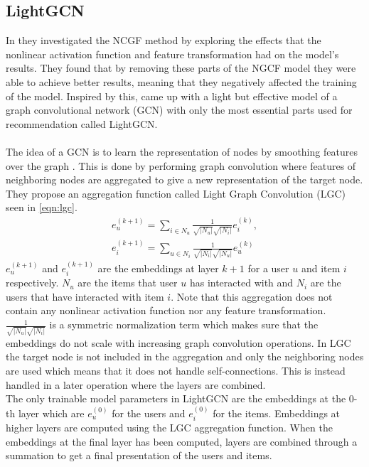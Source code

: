 \subsection{LightGCN}
In \cite{LightGCN} they investigated the NCGF method by exploring the effects that the nonlinear activation function and feature transformation had on the model's results.
They found that by removing these parts of the NGCF model they were able to achieve better results, meaning that they negatively affected the training of the model.
Inspired by this, \cite{LightGCN} came up with a light but effective model of a graph convolutional network (GCN) with only the most essential parts used for recommendation called LightGCN.
\\\\
The idea of a GCN is to learn the representation of nodes by smoothing features over the graph \cite{LightGCN}.
This is done by performing graph convolution where features of neighboring nodes are aggregated to give a new representation of the target node.
They propose an aggregation function called Light Graph Convolution (LGC) seen in \autoref{eqn:lgc}.
\begin{align}\label{eqn:lgc}
    e_{u}^{(k+1)}=\sum_{i\in N_u}\frac{1}{\sqrt{\left | N_u \right |}\sqrt{\left | N_i \right |}}e_{i}^{(k)},\nonumber\\
    e_{i}^{(k+1)}=\sum_{u\in N_i}\frac{1}{\sqrt{\left | N_i \right |}\sqrt{\left | N_u \right |}}e_{u}^{(k)}
\end{align}
$e_{u}^{(k+1)}$ and $e_{i}^{(k+1)}$ are the embeddings at layer $k+1$ for a user $u$ and item $i$ respectively.
$N_u$ are the items that user $u$ has interacted with and $N_i$ are the users that have interacted with item $i$.
Note that this aggregation does not contain any nonlinear activation function nor any feature transformation.
$\frac{1}{\sqrt{\left | N_u \right |}\sqrt{\left | N_i \right |}}$ is a symmetric normalization term which makes sure that the embeddings do not scale with increasing graph convolution operations.
In LGC the target node is not included in the aggregation and only the neighboring nodes are used which means that it does not handle self-connections.
This is instead handled in a later operation where the layers are combined.
\\
The only trainable model parameters in LightGCN are the embeddings at the 0-th layer which are $e_{u}^{(0)}$ for the users and $e_{i}^{(0)}$ for the items.
Embeddings at higher layers are computed using the LGC aggregation function. 
When the embeddings at the final layer has been computed, layers are combined through a summation to get a final presentation of the users and items.
